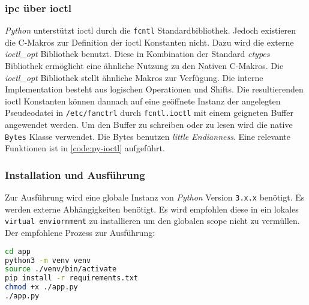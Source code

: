 \subsubsection{\acrshort{ipc} über \acrshort{ioctl}}

\textit{Python} unterstützt \gls{ioctl} durch die \texttt{fcntl} Standardbibliothek.
Jedoch existieren die C-Makros zur Definition der \gls{ioctl} Konstanten nicht.
Dazu wird die externe \textit{ioctl\_opt}\cite{ioctl} Bibliothek benutzt.
Diese in Kombination der Standard \textit{ctypes} Bibliothek ermöglicht eine ähnliche Nutzung zu den Nativen C-Makros.
Die \textit{ioctl\_opt} Bibliothek stellt ähnliche Makros zur Verfügung.
Die interne Implementation besteht aus logischen Operationen und Shifts.
Die resultierenden \gls{ioctl} Konstanten können dannach auf eine geöffnete Instanz der angelegten Pseudeodatei in \texttt{/etc/fanctrl} durch \texttt{fcntl.ioctl} mit einem geigneten Buffer angewendet werden.
Um den Buffer zu schreiben oder zu lesen wird die native \texttt{Bytes} Klasse verwendet.
Die Bytes benutzen \textit{little Endianness}.
Eine relevante Funktionen ist in \autoref{code:py-ioctl} aufgeführt.



\subsubsection{Installation und Ausführung}

Zur Ausführung wird eine globale Instanz von \textit{Python} Version \texttt{3.x.x} benötigt.
Es werden externe Abhängigkeiten benötigt.
Es wird empfohlen diese in ein lokales \texttt{virtual enviornment} zu installieren um den globalen scope nicht zu vermüllen.
Der empfohlene Prozess zur Ausführung:
\begin{lstlisting}[language=bash, numbers=none]
cd app
python3 -m venv venv
source ./venv/bin/activate
pip install -r requirements.txt
chmod +x ./app.py
./app.py
\end{lstlisting}
